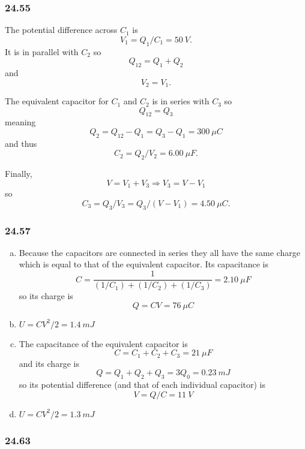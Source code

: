 \documentclass{article}
\begin{document}
\subsubsection{24.55}

The potential difference across $C_1$ is \[V_1 = Q_1 / C_1 = \qty{50}{V}.\] It is in parallel with $C_2$ so \[Q_{12} = Q_1 + Q_2\] and \[V_2 = V_1.\]

The equivalent capacitor for $C_1$ and $C_2$ is in series with $C_3$ so \[Q_{12} = Q_3\] meaning \[Q_2 = Q_{12} - Q_1 = Q_3 - Q_1 = \qty{300}{\mu C}\] and thus \[C_2 = Q_2 / V_2 = \qty{6.00}{\mu F}.\]

Finally, \[V = V_1 + V_3 \Rightarrow V_3 = V - V_1\] so \[C_3 = Q_3 / V_3 = Q_3 / (V - V_1) = \qty{4.50}{\mu C}.\]

\subsubsection{24.57}

\begin{enumerate}[(a)]
  \item Because the capacitors are connected in series they all have the same charge which is equal to that of the equivalent capacitor. Its capacitance is \[C = \frac{1}{(1 / C_1) + (1 / C_2) + (1 / C_3)} = \qty{2.10}{\mu F}\] so its charge is \[Q = C V = \qty{76}{\mu C}\]

  \item $U = C V^2 / 2 = \qty{1.4}{mJ}$

  \item The capacitance of the equivalent capacitor is \[C = C_1 + C_2 + C_3 = \qty{21}{\mu F}\] and its charge is \[Q = Q_1 + Q_2 + Q_3 = 3 Q_0 = \qty{0.23}{mJ}\] so its potential difference (and that of each individual capacitor) is \[V = Q / C = \qty{11}{V}\]

  \item $U = C V^2 / 2 = \qty{1.3}{mJ}$
\end{enumerate}

\subsubsection{24.63}
\end{document}
